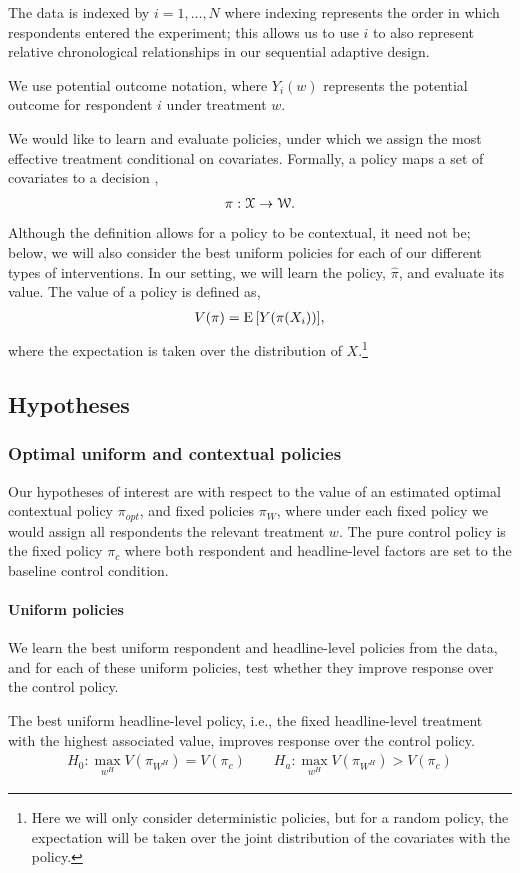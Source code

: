 \documentclass[letterpaper, 12pt, parskip=full,DIV=10]{scrartcl}
\begin{document}
The data is indexed by $i = 1, \dots, N$ where indexing represents the order in which respondents entered the experiment; this allows us to use $i$ to also represent relative chronological relationships in our sequential adaptive design. 

We use potential outcome notation, where $Y_i(w)$ represents the potential outcome for respondent $i$ under treatment $w$.


We would like to learn and evaluate policies, under which we assign the most effective treatment conditional on covariates. Formally, a policy maps a set of covariates to a decision \citep{athey2021policy},
\begin{align}
  \pi: {\EuScript X} \rightarrow {\EuScript W}. 
  \label{eq:policy}
\end{align}
Although the definition allows for a policy to be contextual, it need not be; below, we will also consider the best uniform policies for each of our different types of interventions. In our setting, we will learn the policy, $\hat \pi$, and evaluate its value. The value of a policy is defined as, 
\begin{align}
V(\pi) =  {\textrm E}\,[Y(\pi(X_{i}))],
  \label{eq:policy_value}
\end{align}
where the expectation is taken over the distribution of $X$.\footnote{Here we will only consider deterministic policies, but for a random policy, the expectation will be taken over the joint distribution of the covariates with the policy. }

\subsection{Hypotheses}\label{hypotheses}

\subsubsection{Optimal uniform and contextual policies}\label{policiesbest}
Our hypotheses of interest are with respect to the value of an estimated optimal contextual policy $\pi_{opt}$, and fixed policies $\pi_{W}$, where under each fixed policy we would assign all respondents the relevant treatment $w$. The pure control policy is the fixed policy $\pi_{c}$ where both respondent and headline-level factors are set to the baseline control condition. 

\paragraph{Uniform policies}
{We learn the best uniform respondent and headline-level policies from the data, and for each of these uniform policies, test whether they improve response over the control policy.}
\setcounter{hypothesis}{1}
  \begin{subhyp}
  The best uniform headline-level policy, i.e., the fixed headline-level treatment with the highest associated value, improves response over the control policy. 
  \label{eq:headlinectr}
\begin{align}
  H_{0}: \max_{w^H} V(\pi_{W^H}) = V(\pi_{c}) \qquad H_{a}:  \max_{w^H} V(\pi_{W^H}) > V(\pi_{c})
\end{align}
\end{subhyp}
\end{document}
